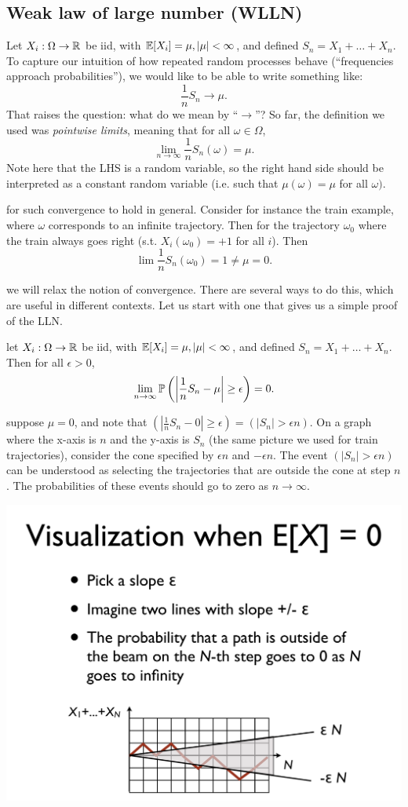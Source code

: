 \documentclass{article}
\begin{document}
\subsection{Weak law of large number (WLLN)}

Let $X_i : \Omega \to \R$ be iid, with $\E[X_i] = \mu, |\mu| < \infty$, and defined $S_n = X_1 + \dots + X_n$. To capture our intuition of how repeated random processes behave (``frequencies approach probabilities''), we would like to be able to write something like: \[ \frac{1}{n} S_n \to \mu. \]That raises the question: what do we mean by ``$\to$''? So far, the definition we used was \emph{pointwise limits}, meaning that for all $\omega\in\Omega$, \[ \lim_{n\to\infty} \frac{1}{n} S_n(\omega) = \mu.\]Note here that the LHS is a random variable, so the right hand side should be interpreted as a constant random variable (i.e. such that $\mu(\omega) = \mu$ for all $\omega)$. 

 for such convergence to hold in general. Consider for instance the train example, where $\omega$ corresponds to an infinite trajectory. Then for the trajectory $\omega_0$ where the train always goes right (s.t. $X_i(\omega_0) = +1$ for all $i$). Then \[ \lim \frac{1}{n} S_n(\omega_0) = 1 \neq \mu = 0.\]

 we will relax the notion of convergence. There are several ways to do this, which are useful in different contexts. Let us start with one that gives us a simple proof of the LLN.

 let $X_i : \Omega \to \R$ be iid, with $\E[X_i] = \mu, |\mu| < \infty$, and defined $S_n = X_1 + \dots + X_n$. Then for all $\epsilon > 0$, \[ \lim_{n\to\infty} \P\left( \left| \frac{1}{n} S_n - \mu\right| \ge \epsilon \right) = 0. \]

 suppose $\mu = 0$, and note that $\left( \left| \frac{1}{n} S_n -0\right| \ge \epsilon \right) = ( |S_n| > \epsilon n)$. On a graph where the x-axis is $n$ and the y-axis is $S_n$ (the same picture we used for train trajectories), consider the cone specified by $\epsilon n$ and $-\epsilon n$. The event $( |S_n| > \epsilon n)$ can be understood as selecting the trajectories that are outside the cone at step $n$. The probabilities of these events should go to zero as $n\to\infty$.
\begin{center}
\includegraphics[width=0.7\linewidth]{figures/LLN}
\end{center}
\end{document}
